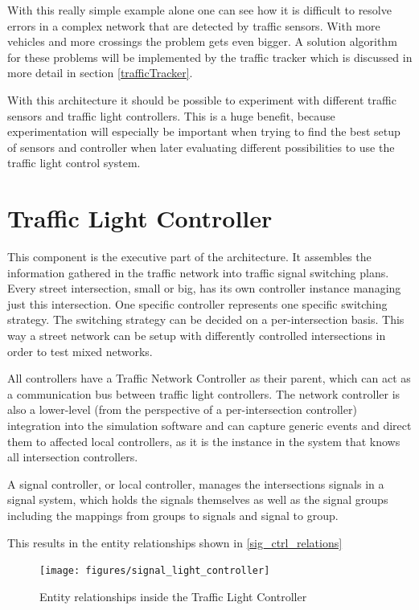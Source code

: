 With this really simple example alone one can see how it is difficult to resolve errors in a complex network that are detected by traffic sensors. With more vehicles and more crossings the problem gets even bigger. A solution algorithm for these problems will be implemented by the traffic tracker which is discussed in more detail in section \ref{trafficTracker}.

With this architecture it should be possible to experiment with different traffic sensors and traffic light controllers. This is a huge benefit, because experimentation will especially be important when trying to find the best setup of sensors and controller when later evaluating different possibilities to use the traffic light control system.

\section{Traffic Light Controller}
\label{trafficLightController}

This component is the executive part of the architecture. It assembles the information gathered in the traffic network into traffic signal switching plans. Every street intersection, small or big, has its own controller instance managing just this intersection. One specific controller represents one specific switching strategy. The switching strategy can be decided on a per-intersection basis. This way a street network can be setup with differently controlled intersections in order to test mixed networks.

All controllers have a Traffic Network Controller as their parent, which can act as a communication bus between traffic light controllers. The network controller is also a lower-level (from the perspective of a per-intersection controller) integration into the simulation software and can capture generic events and direct them to affected local controllers, as it is the instance in the system that knows all intersection controllers.

A signal controller, or local controller, manages the intersections signals in a signal system, which holds the signals themselves as well as the signal groups including the mappings from groups to signals and signal to group.

This results in the entity relationships shown in \autoref{sig_ctrl_relations}

\begin{figure}[!ht]
	\centering
	\texttt{[image: figures/signal\_light\_controller]}
	\label{sig_ctrl_relations}
	\caption{Entity relationships inside the Traffic Light Controller}
\end{figure}

